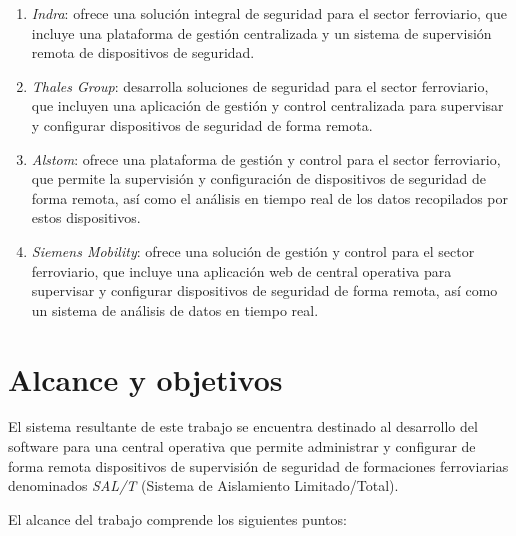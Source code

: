 \begin{enumerate}

  \item \textit{Indra}\citep{indra}: ofrece una solución integral de seguridad para el sector ferroviario, que incluye una plataforma de gestión centralizada y un sistema de supervisión remota de dispositivos de seguridad.

  \item \textit{Thales Group}\citep{thales}: desarrolla soluciones de seguridad para el sector ferroviario, que incluyen una aplicación de gestión y control centralizada para supervisar y configurar dispositivos de seguridad de forma remota.

  \item \textit{Alstom}\citep{alstom}: ofrece una plataforma de gestión y control para el sector ferroviario, que permite la supervisión y configuración de dispositivos de seguridad de forma remota, así como el análisis en tiempo real de los datos recopilados por estos dispositivos.

\item \textit{Siemens Mobility}\citep{siemens}: ofrece una solución de gestión y control para el sector ferroviario, que incluye una aplicación web de central operativa para supervisar y configurar dispositivos de seguridad de forma remota, así como un sistema de análisis de datos en tiempo real.

\end{enumerate}


\newpage
\section{Alcance y objetivos}

El sistema resultante de este trabajo se encuentra destinado al desarrollo del software para una central operativa que permite administrar y configurar de forma remota dispositivos de supervisión de seguridad de formaciones ferroviarias denominados \textit{SAL/T} (Sistema de Aislamiento Limitado/Total). 


El alcance del trabajo comprende los siguientes puntos:

